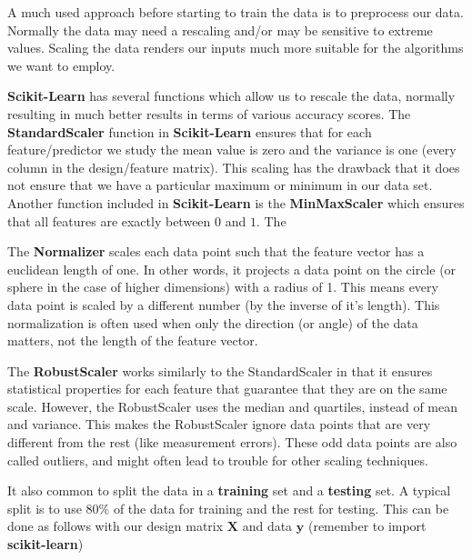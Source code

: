 \documentclass[%
oneside,                 %
final,                   %
10pt]{article}
\newenvironment{doconceexercise}{}{}
\newcounter{doconceexercisecounter}
\begin{document}
\begin{doconceexercise}

                             

A much used approach before starting to train the data is  to preprocess our
data. Normally the data may need a rescaling and/or may be sensitive
to extreme values. Scaling the data renders our inputs much more
suitable for the algorithms we want to employ.

\textbf{Scikit-Learn} has several functions which allow us to rescale the
data, normally resulting in much better results in terms of various
accuracy scores.  The \textbf{StandardScaler} function in \textbf{Scikit-Learn}
ensures that for each feature/predictor we study the mean value is
zero and the variance is one (every column in the design/feature
matrix).  This scaling has the drawback that it does not ensure that
we have a particular maximum or minimum in our data set. Another
function included in \textbf{Scikit-Learn} is the \textbf{MinMaxScaler} which
ensures that all features are exactly between $0$ and $1$. The

The \textbf{Normalizer} scales each data
point such that the feature vector has a euclidean length of one. In other words, it
projects a data point on the circle (or sphere in the case of higher dimensions) with a
radius of 1. This means every data point is scaled by a different number (by the
inverse of it’s length).
This normalization is often used when only the direction (or angle) of the data matters,
not the length of the feature vector.

The \textbf{RobustScaler} works similarly to the StandardScaler in that it
ensures statistical properties for each feature that guarantee that
they are on the same scale. However, the RobustScaler uses the median
and quartiles, instead of mean and variance. This makes the
RobustScaler ignore data points that are very different from the rest
(like measurement errors). These odd data points are also called
outliers, and might often lead to trouble for other scaling
techniques.

It also common to split the data in a \textbf{training} set and a \textbf{testing} set. A typical split is to use $80\%$ of the data for training and the rest
for testing. This can be done as follows with our design matrix $\bm{X}$ and data $\bm{y}$ (remember to import \textbf{scikit-learn})




\end{doconceexercise}
\end{document}
